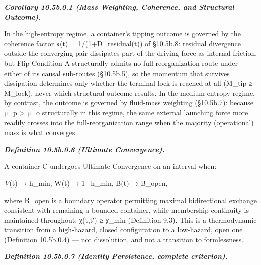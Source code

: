 \documentclass[
]{article}
\begin{document}
\emph{\textbf{Corollary 10.5b.0.1 (Mass Weighting, Coherence, and
Structural Outcome).}}

In the high-entropy regime, a container's tipping outcome is governed by
the coherence factor κ(t) = 1/(1+D\_residual(t)) of §10.5b.8: residual
divergence outside the converging pair dissipates part of the driving
force as internal friction, but Flip Condition A structurally admits no
full-reorganization route under either of its causal sub-routes
(§10.5b.5), so the momentum that survives dissipation determines only
whether the terminal lock is reached at all (M\_tip ≥ M\_lock), never
which structural outcome results. In the medium-entropy regime, by
contrast, the outcome is governed by fluid-mass weighting (§10.5b.7):
because μ\_p \textgreater{} μ\_o structurally in this regime, the same
external launching force more readily crosses into the
full-reorganization range when the majority (operational) mass is what
converges.

\emph{\textbf{Definition 10.5b.0.6 (Ultimate Convergence).}}

A container C undergoes Ultimate Convergence on an interval when:

\emph{V}(t) → h\_min, W(t) → 1−h\_min, B(t) → B\_open,

where B\_open is a boundary operator permitting maximal bidirectional
exchange consistent with remaining a bounded container, while membership
continuity is maintained throughout: χ(t,t′) ≥ χ\_min (Definition 9.3).
This is a thermodynamic transition from a high-hazard, closed
configuration to a low-hazard, open one (Definition 10.5b.0.4) --- not
dissolution, and not a transition to formlessness.

\emph{\textbf{Definition 10.5b.0.7 (Identity Persistence, complete
criterion).}}
\end{document}
